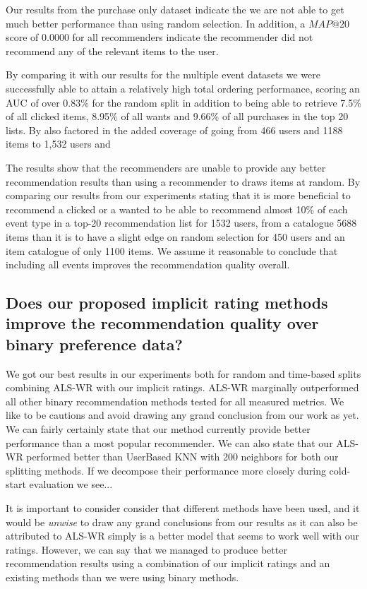 Our results from the purchase only dataset indicate the we are not able to get much better performance than using random selection.
In addition, a $MAP@20$ score of 0.0000 for all recommenders indicate the recommender did not recommend any of the relevant items 
to the user. 

By comparing it with our results for the multiple event datasets we were successfully able to attain a relatively high total
ordering performance, scoring an AUC of over 0.83\% for the random split in addition to being able to retrieve
7.5\% of all clicked items, 8.95\% of all wants and 9.66\% of all purchases in the top 20 lists. By also factored in the added
coverage of going from 466 users and 1188 items to 1,532 users and 


The results show that the recommenders are unable to provide any better recommendation results than using a recommender to draws
items at random. By comparing our results from our experiments stating that it is more beneficial to recommend a clicked or a wanted to be
able to recommend almost 10\% of each event type in a top-20 recommendation list for 1532 users, from a catalogue 5688 items than it is to
have a slight edge on random selection for 450 users and an item catalogue of only 1100 items. We assume it reasonable to conclude that including
all events improves the recommendation quality overall.

\subsection{Does our proposed implicit rating methods improve the recommendation quality over binary preference data?}

We got our best results in our experiments both for random and time-based splits combining ALS-WR with our implicit ratings.
ALS-WR marginally outperformed all other binary recommendation methods tested for all measured metrics.
We like to be cautions and avoid drawing any grand conclusion from our work as yet. We can fairly certainly state
that our method currently provide better performance than a most popular recommender. We can also state that
our ALS-WR performed better than UserBased KNN with 200 neighbors for 
both our splitting methods. If we decompose their performance more closely during cold-start evaluation we see...

It is important to consider consider that different methods have been used, and it would be \emph{unwise}
to draw any grand conclusions from our results as it can also be attributed to ALS-WR simply is a better
model that seems to work well with our ratings. However, we can say that we managed to produce better recommendation
results using a combination of our implicit ratings and an existing methods than we were using binary methods.

